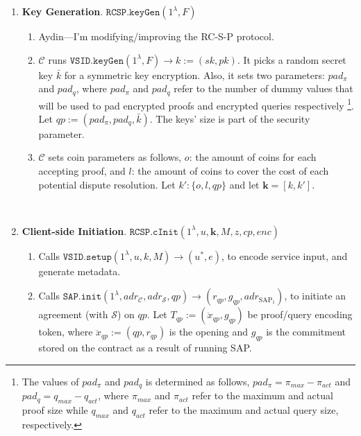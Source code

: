 \begin{enumerate}
\item \textbf{Key Generation}. $\mathtt{RCSP}.\mathtt{keyGen}(1^{\scriptscriptstyle\lambda},F)$
\begin{enumerate}

\item {\color{purple}Aydin---I'm modifying/improving the RC-S-P protocol.}

\item  $\mathcal C$ runs  $\mathtt{VSID.keyGen}(1^{\lambda},F)\rightarrow k:=(sk,pk)$. It picks a random secret key  $\bar{k}$ for a symmetric key encryption. Also, it sets two parameters: $pad_{\scriptscriptstyle \pi}$ and $pad_{\scriptscriptstyle q}$, where  $pad_{\scriptscriptstyle \pi}$ and $pad_{\scriptscriptstyle q}$  refer to the number of  dummy values that will be used to pad encrypted proofs and encrypted queries respectively \footnote{\scriptsize The values of  $pad_{\scriptscriptstyle \pi}$ and $pad_{\scriptscriptstyle q}$ is determined as follows, $pad_{\scriptscriptstyle \pi}=\pi_{\scriptscriptstyle max}-\pi_{\scriptscriptstyle act}$ and $pad_{\scriptscriptstyle q}=q_{\scriptscriptstyle max}-q_{\scriptscriptstyle act}$, where $\pi_{\scriptscriptstyle max}$ and $\pi_{\scriptscriptstyle act}$ refer to the maximum and actual proof size  while $q_{\scriptscriptstyle max}$ and $q_{\scriptscriptstyle act}$ refer to the maximum and actual query size, respectively.}.  Let $qp:=(pad_{\scriptscriptstyle \pi},pad_{\scriptscriptstyle q}, \bar{k})$. The keys' size is part of the security parameter. 


\item  $\mathcal C$ sets coin parameters as   follows,   $o$: the amount of coins for each accepting proof, and $l$: the amount of coins  to cover the cost of each potential dispute resolution.    Let $k':\{o,l,qp\}$ and  let $\bm{k}=[k,k']$. 
\end{enumerate}

\

\item \textbf{Client-side Initiation}. $\mathtt{RCSP}.\mathtt{cInit}(1^\lambda, u,\bm{k}, M,z,cp,enc)$
\begin{enumerate}

\item Calls  $\mathtt{VSID.setup}(1^{\lambda}, u,k,M)\rightarrow (u^{\scriptscriptstyle *},e)$, to encode  service input, and generate metadata. 


\item  Calls $\mathtt{SAP.init}(1^{\scriptscriptstyle\lambda}, adr_{\scriptscriptstyle\mathcal{C}}, adr_{\scriptscriptstyle\mathcal{S}},qp )\rightarrow(r_{\scriptscriptstyle qp}, g_{\scriptscriptstyle qp}, adr_{\scriptscriptstyle\text{SAP}_{\scriptscriptstyle 1}})$, to initiate an agreement (with $\mathcal{S}$) on $qp$.  Let $T_{\scriptscriptstyle qp}:=(\ddot{x}_{\scriptscriptstyle qp}, g_{\scriptscriptstyle qp})$ be proof/query encoding token,  where  $\ddot{x}_{\scriptscriptstyle qp}:=(qp,r_{\scriptscriptstyle qp})$ is the opening and $g_{\scriptscriptstyle qp}$ is the commitment stored on the contract as a result of running   SAP. 



\end{enumerate}
\end{enumerate}
